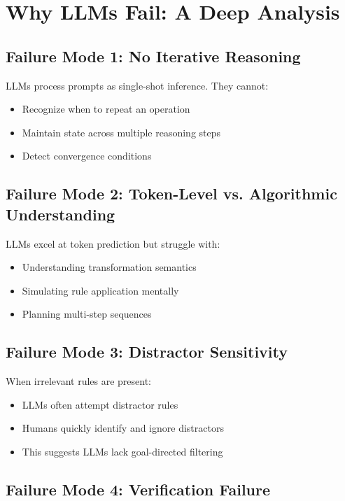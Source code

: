\documentclass[11pt,a4paper]{article}
\begin{document}
\section{Why LLMs Fail: A Deep Analysis}

\subsection{Failure Mode 1: No Iterative Reasoning}

LLMs process prompts as single-shot inference. They cannot:
\begin{itemize}
    \item Recognize when to repeat an operation
    \item Maintain state across multiple reasoning steps
    \item Detect convergence conditions
\end{itemize}

\subsection{Failure Mode 2: Token-Level vs. Algorithmic Understanding}

LLMs excel at token prediction but struggle with:
\begin{itemize}
    \item Understanding transformation semantics
    \item Simulating rule application mentally
    \item Planning multi-step sequences
\end{itemize}

\subsection{Failure Mode 3: Distractor Sensitivity}

When irrelevant rules are present:
\begin{itemize}
    \item LLMs often attempt distractor rules
    \item Humans quickly identify and ignore distractors
    \item This suggests LLMs lack goal-directed filtering
\end{itemize}

\subsection{Failure Mode 4: Verification Failure}
\end{document}
